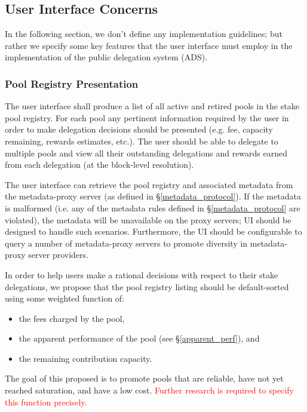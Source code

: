 \subsection{User Interface Concerns} \label{ads_ui}
In the following section, we don't define any implementation guidelines; but rather we specify some key features that the user interface must employ in the implementation of the public delegation system (ADS). 

\subsubsection{Pool Registry Presentation} \label{registry_presentation}
The user interface shall produce a list of all active and retired pools in the stake pool registry. For each pool any pertinent information required by the user in order to make delegation decisions should be presented (e.g. fee, capacity remaining, rewards estimates, etc.). The user should be able to delegate to multiple pools and view all their outstanding delegations and rewards earned from each delegation (at the block-level resolution). 

The user interface can retrieve the pool registry and associated metadata from the metadata-proxy server (as defined in \S\ref{metadata_protocol}). If the metadata is malformed (i.e. any of the metadata rules defined in \S\ref{metadata_protocol} are violated), the metadata will be unavailable on the proxy servers; UI should be designed to handle such scenarios. Furthermore, the UI should be configurable to query a number of metadata-proxy servers to promote diversity in metadata-proxy server providers. 

In order to help users make a rational decisions with respect to their stake delegations, we propose that the pool registry listing should be default-sorted using some weighted function of:  
\begin{itemize}[label=--,nosep]
    \item the fees charged by the pool, 
    \item the apparent performance of the pool (see \S\ref{apparent_perf}), and
    \item the remaining contribution capacity.
\end{itemize}
The goal of this proposed  is to promote pools that are reliable, have not yet reached saturation, and have a low cost. \textcolor{red}{Further research is required to specify this function precisely.}  

